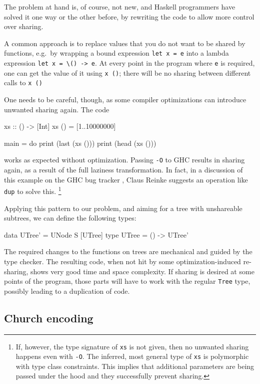 \documentclass[preprint]{sigplanconf}
\theoremstyle{nonumberplain}
\newcommand{\li}{\lstinline[style=Haskell]}
\newcommand{\ci}{\lstinline[style=Cmm]}
\begin{document}
The problem at hand is, of course, not new, and Haskell programmers have solved it one way or the other before, by rewriting the code to allow more control over sharing.

\label{sec:unit}

A common approach is to replace values that you do not want to be shared by functions, e.g.\ by wrapping a bound expression \li-let x = e- into a lambda expression \li!let x = \() -> e!. At every point in the program where \li-e- is required, one can get the value of it using \li-x ()-; there will be no sharing between different calls to \li-x ()-

One needs to be careful, though, as some compiler optimizations can introduce unwanted sharing again. The code
\begin{haskell}
xs :: () -> [Int]
xs () = [1..10000000]

main = do
    print (last (xs ()))
    print (head (xs ()))
\end{haskell}
works as expected without optimization. Passing  \ci!-O! to GHC results in sharing again, as a result of the full laziness transformation. In fact, in a discussion of this example on the GHC bug tracker \citep{spaceleakbug}, Claus Reinke suggests an operation like \li-dup- to solve this.%
\footnote{
If, however, the type signature of \li-xs- is not given, then no unwanted sharing happens even with \ci!-O!. The inferred, most general type of \li-xs- is polymorphic with type class constraints. This implies that additional parameters are being passed under the hood and they successfully prevent sharing.
}

Applying this pattern to our problem, and aiming for a tree with unshareable subtrees, we can define the following types:
\begin{haskell}
data UTree' = UNode S [UTree]
type UTree = () -> UTree'
\end{haskell}
The required changes to the functions on trees are mechanical and guided by the type checker. The resulting code, when not hit by some optimization-induced re-sharing, shows very good time and space complexity. If sharing is desired at some points of the program, those parts will have to work with the regular \li-Tree- type, possibly leading to a duplication of code.

\subsection{Church encoding}
\label{sec:church}
\end{document}
